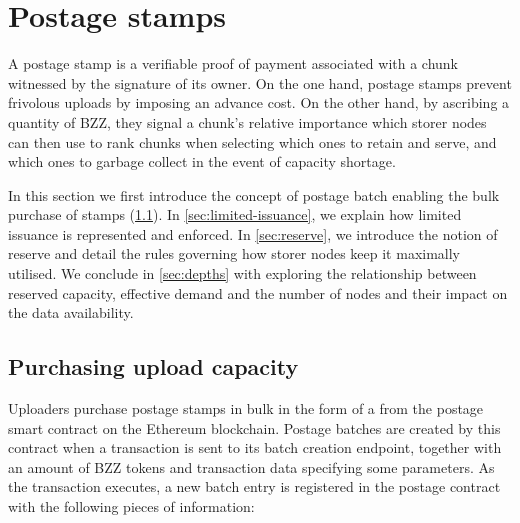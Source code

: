 \section{Postage stamps}\label{sec:postage-stamps}

A postage stamp is a verifiable proof of payment associated with a chunk witnessed by the signature of its owner. On the one hand, postage stamps prevent frivolous uploads by imposing an advance cost. On the other hand, by ascribing a quantity of BZZ, they signal a chunk's relative importance which storer nodes can then use to rank chunks when selecting which ones to retain and serve, and which ones to garbage collect in the event of capacity shortage.

In this section we first introduce the concept of postage batch enabling the bulk purchase of stamps (\ref{sec:purchasing-upload}). In \ref{sec:limited-issuance}, we explain how limited issuance is represented and enforced. In \ref{sec:reserve}, we introduce the notion of reserve and detail the rules governing how storer nodes keep it maximally utilised. We conclude in \ref{sec:depths} with exploring the relationship between reserved capacity, effective demand and the number of nodes and their impact on the data availability.

\subsection{Purchasing upload capacity}\label{sec:purchasing-upload}


Uploaders purchase postage stamps in bulk in the form of a  from the postage smart contract on the Ethereum blockchain. Postage batches are created by this contract when a transaction is sent to its batch creation endpoint, together with an amount of BZZ tokens and transaction data specifying some parameters. As the transaction executes, a new batch entry is registered in the postage contract with the following pieces of information:

